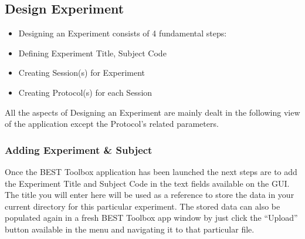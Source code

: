 \documentclass[letterpaper,10pt,english]{sphinxmanual}
\begin{document}
\begin{figure}[htbp]
\centering

\noindent{}
\end{figure}


\subsection{Design Experiment}
\label{\detokenize{4_DesignExperiment:design-experiment}}\label{\detokenize{4_DesignExperiment::doc}}\begin{itemize}
\item {} 
\sphinxAtStartPar
Designing an Experiment consists of 4 fundamental steps:

\item {} 
\sphinxAtStartPar
Defining Experiment Title, Subject Code

\item {} 
\sphinxAtStartPar
Creating Session(s) for Experiment

\item {} 
\sphinxAtStartPar
Creating Protocol(s) for each Session

\end{itemize}

\sphinxAtStartPar
All the aspects of Designing an Experiment are mainly dealt in the following view of the application except the Protocol’s related parameters.

\begin{figure}[htbp]
\centering

\noindent{}
\end{figure}


\subsubsection{Adding Experiment \& Subject}
\label{\detokenize{4_DesignExperiment:adding-experiment-subject}}
\sphinxAtStartPar
Once the BEST Toolbox application has been launched the next steps are to add the Experiment Title and Subject Code in the text fields available on the GUI. The title you will enter here will be used as a reference to store the data in your current directory for this particular experiment. The stored data can also be populated again in a fresh BEST Toolbox app window by just click the “Upload” button available in the menu and navigating it to that particular file.
\end{document}
